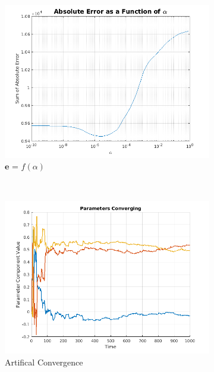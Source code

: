 \documentclass[11pt, fleqn]{article}
\begin{document}
\begin{figure}[!h]
    \centering
    \begin{subfigure}[b]{0.3\textwidth}
        \includegraphics[width=\textwidth]{error-vs-alpha-order-3.png}
	\caption{$\bm{e}$ = $f(\alpha)$}
	\label{fig:error-vs-alpha-order-3}
    \end{subfigure}
    ~ 
	\begin{subfigure}[b]{0.3\textwidth}
        \includegraphics[width=\textwidth]{kalman-parameter-converge-artificial.png}
	\caption{Artifical Convergence}
	\label{fig:kalman-parameter-converge-artificial}
    \end{subfigure}
    ~ 
    \begin{subfigure}[b]{0.3\textwidth}

\end{subfigure}
\end{figure}
\end{document}
